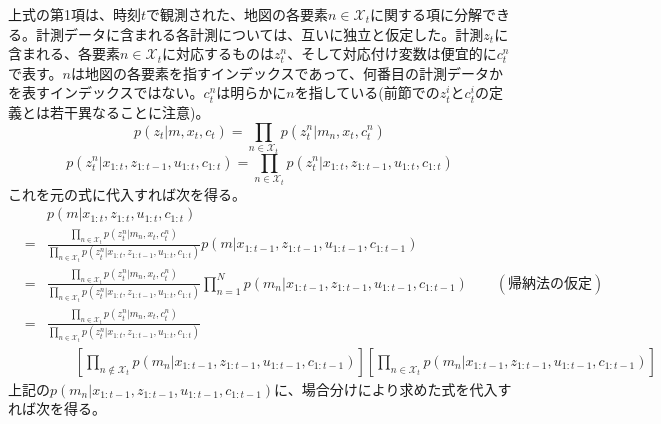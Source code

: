 \documentclass[dvipdfmx,a4paper]{jsarticle}
\begin{document}
上式の第1項は、時刻$t$で観測された、地図の各要素$n \in \mathcal{X}_t$に関する項に分解できる。計測データに含まれる各計測については、互いに独立と仮定した。計測$z_t$に含まれる、各要素$n \in \mathcal{X}_t$に対応するものは$z_t^n$、そして対応付け変数は便宜的に$c_t^n$で表す。$n$は地図の各要素を指すインデックスであって、何番目の計測データかを表すインデックスではない。$c_t^n$は明らかに$n$を指している(前節での$z_t^i$と$c_t^i$の定義とは若干異なることに注意)。
\begin{equation}
	p(z_t | m, x_t, c_t) = \prod_{n \in \mathcal{X}_t} p(z_t^n | m_n, x_t, c_t^n)
\end{equation}
\begin{equation}
	p(z_t^n | x_{1 : t}, z_{1 : t - 1}, u_{1 : t}, c_{1 : t}) = \prod_{n \in \mathcal{X}_t} p(z_t^n | x_{1 : t}, z_{1 : t - 1}, u_{1 : t}, c_{1 : t})
\end{equation}
これを元の式に代入すれば次を得る。
\begin{eqnarray}
	&& p(m | x_{1 : t}, z_{1 : t}, u_{1 : t}, c_{1 : t}) \nonumber \\
	&=& \frac{\prod_{n \in \mathcal{X}_t} p(z_t^n | m_n, x_t, c_t^n)}{\prod_{n \in \mathcal{X}_t} p(z_t^n | x_{1 : t}, z_{1 : t - 1}, u_{1 : t}, c_{1 : t})} p(m | x_{1 : t - 1}, z_{1 : t - 1}, u_{1 : t - 1}, c_{1 : t - 1}) \nonumber \\
	&=& \frac{\prod_{n \in \mathcal{X}_t} p(z_t^n | m_n, x_t, c_t^n)}{\prod_{n \in \mathcal{X}_t} p(z_t^n | x_{1 : t}, z_{1 : t - 1}, u_{1 : t}, c_{1 : t})} \prod_{n = 1}^N p(m_n | x_{1 : t - 1}, z_{1 : t - 1}, u_{1 : t - 1}, c_{1 : t - 1}) \qquad (帰納法の仮定) \nonumber \\
	&=& \frac{\prod_{n \in \mathcal{X}_t} p(z_t^n | m_n, x_t, c_t^n)}{\prod_{n \in \mathcal{X}_t} p(z_t^n | x_{1 : t}, z_{1 : t - 1}, u_{1 : t}, c_{1 : t})} \nonumber \\
	&& \qquad \left[ \prod_{n \notin \mathcal{X}_t} p(m_n | x_{1 : t - 1}, z_{1 : t - 1}, u_{1 : t - 1}, c_{1 : t - 1}) \right] \left[ \prod_{n \in \mathcal{X}_t} p(m_n | x_{1 : t - 1}, z_{1 : t - 1}, u_{1 : t - 1}, c_{1 : t - 1}) \right] \nonumber
\end{eqnarray}
上記の$p(m_n | x_{1 : t - 1}, z_{1 : t - 1}, u_{1 : t - 1}, c_{1 : t - 1})$に、場合分けにより求めた式を代入すれば次を得る。
\end{document}
